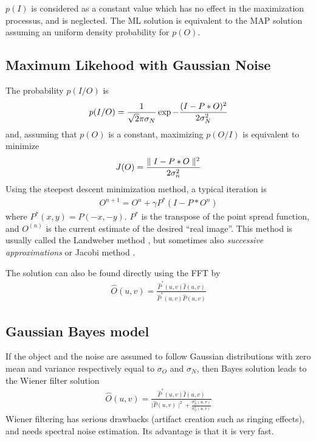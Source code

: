 \documentclass[11pt,a4paper]{article}
\newcommand{\be}{\begin{eqnarray}}
\newcommand{\ee}{\end{eqnarray}}
\begin{document}
$p(I)$ is considered as a constant value which
has no effect in the maximization processus, and is neglected.
The ML solution is equivalent to the MAP solution assuming an uniform 
density probability for $p(O)$.
 
\subsection{Maximum Likehood with Gaussian Noise}
The probability $p(I/O)$ is 
\be
p(I/O) = {1 \over \sqrt{2} \pi \sigma_N} \exp{-{(I-P*O)^2 \over 2 \sigma_N^2}} 
\ee
and, assuming that $p(O)$ is a constant,
 maximizing $p(O/I)$ is equivalent to minimize
\be
J(O) = {\parallel I - P * O \parallel^2 \over 2 \sigma_n^2}  
\ee
Using the steepest descent minimization method, a typical iteration is
\be
O^{n+1} = O^{n} + \gamma P^* (I - P * O^n)
\ee
where $P^*(x,y)=P(-x,-y)$. $P^*$ is the transpose of the point
spread function, 
and $O^{(n)}$ is the current estimate of the desired ``real image''.  
This method is usually called the Landweber method \cite{rest:landweber51}, 
but sometimes also {\em successive approximations} or 
Jacobi method \cite{ima:bertero98}.

The solution can also be found directly using the FFT by
\be
\hat{O}(u,v) = \frac{\hat{P}^*(u,v) \hat{I}(u,v)}
                {\hat{P}^*(u,v) \hat{P}(u,v)}   
\ee

\subsection{Gaussian Bayes model}

If the object and the noise are assumed to follow Gaussian distributions
with zero mean and variance respectively equal to $\sigma_O$ and $\sigma_N$, 
then Bayes solution leads to the Wiener filter solution
\be
\hat{O}(u,v) = \frac{ 
    \hat{P}^*(u,v) \hat{I}(u,v)} {\mid\hat{P}(u,v)\mid^2+ 
    \frac{\sigma_N^2(u,v)}{\sigma_O^2(u,v)}}
\ee
Wiener filtering has serious drawbacks (artifact creation such as ringing
effects), and needs spectral noise estimation. Its advantage is that it
is very fast.
\end{document}
